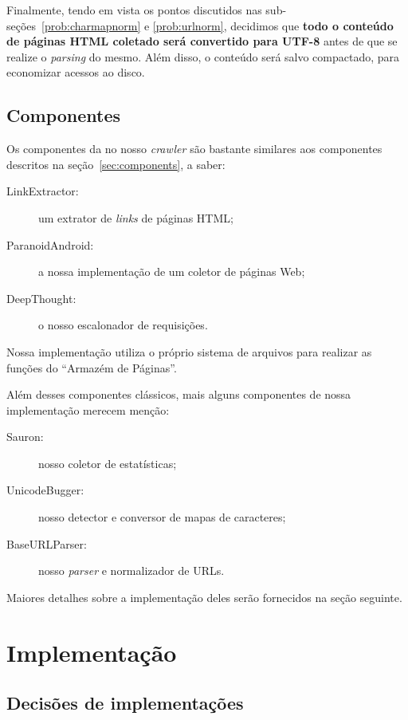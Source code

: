 \documentclass[10pt,twocolumn]{article}
\begin{document}
Finalmente, tendo em vista os pontos discutidos nas
sub-seções~\ref{prob:charmapnorm} e \ref{prob:urlnorm}, decidimos que
\textbf{todo o conteúdo de páginas HTML coletado será convertido para
UTF-8} antes
de que se realize o \emph{parsing} do mesmo. Além disso, o conteúdo será
salvo compactado, para economizar acessos ao disco.


\subsection{Componentes}

Os componentes da no nosso \emph{crawler} são bastante similares aos
componentes descritos na seção~\ref{sec:components}, a saber:
\begin{description}
\item[LinkExtractor:] um extrator de \emph{links} de páginas HTML;
\item[ParanoidAndroid:] a nossa implementação de um coletor de páginas
Web;
\item[DeepThought:] o nosso escalonador de requisições.
\end{description}

Nossa implementação utiliza o próprio sistema de arquivos para realizar
as funções do ``Armazém de Páginas''.

Além desses componentes clássicos, mais alguns componentes de nossa
implementação merecem menção:
\begin{description}
\item[Sauron:] nosso coletor de estatísticas;
\item[UnicodeBugger:] nosso detector e conversor de mapas de caracteres;
\item[BaseURLParser:] nosso \emph{parser} e normalizador de URLs.
\end{description}

Maiores detalhes sobre a implementação deles serão fornecidos na seção
seguinte.


\section{Implementação}\label{sec:implementation}

\subsection{Decisões de implementações}
\end{document}
